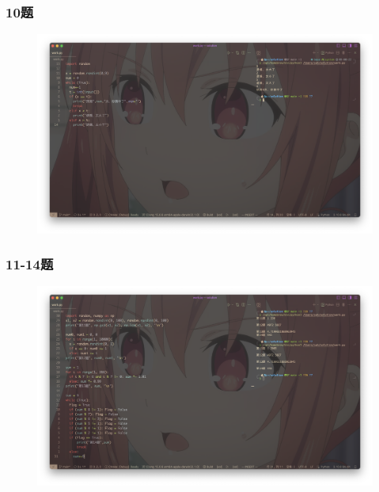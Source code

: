\documentclass{beamer}
\begin{document}
  \begin{frame}[fragile]
    \frametitle{10题}
    \begin{figure}[!htb] %
      \includegraphics[width=1\textwidth,height=0.8\textheight]{./graph/python-5.10.png} %
    \end{figure}
  \end{frame}
  \begin{frame}[fragile]
    \frametitle{11-14题}
    \begin{figure}[!htb] %
      \includegraphics[width=1\textwidth,height=0.8\textheight]{./graph/python-5.11-5.14.png} %
    \end{figure}
  \end{frame}
  
\end{document}

